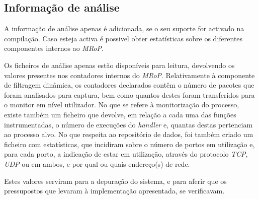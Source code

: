 \subsection{Informação de análise}
A informação de análise apenas é adicionada, se o seu suporte for activado na compilação.
Caso esteja activa é possivel obter estatísticas sobre os diferentes componentes internos ao \textit{MRoP}.

Os ficheiros de análise apenas estão disponíveis para leitura, devolvendo os valores presentes nos contadores internos do \textit{MRoP}.
Relativamente à componente de filtragem dinâmica, os contadores declarados contêm o número de pacotes que foram analisados para captura, bem como quantos destes foram transferidos para o monitor em nível utilizador.
No que se refere à monitorização do processo, existe também um ficheiro que devolve, em relação a cada uma das funções instrumentadas, o número de execuções do \textit{handler} e, quantas destas pertenciam ao processo alvo.
No que respeita ao repositório de dados, foi também criado um ficheiro com estatísticas, que incidiram sobre o número de portos em utilização e, para cada porto, a indicação de estar em utilização, através do protocolo \textit{TCP}, \textit{UDP} ou em ambos, e por qual ou quais endereço(s) de rede.

Estes valores serviram para a depuração do sistema, e para aferir que os pressupostos que levaram à implementação apresentada, se verificavam.
